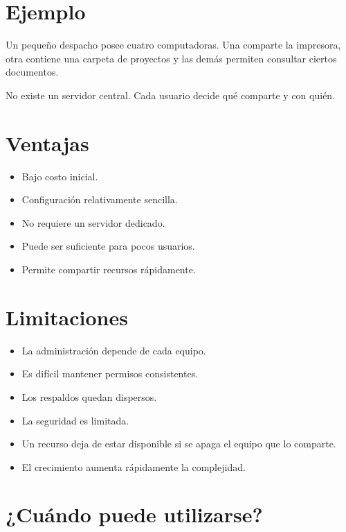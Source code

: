 \documentclass[
  spanish,
  letterpaper,
]{scrbook}
\providecommand{\tightlist}{%
  \setlength{\itemsep}{0pt}\setlength{\parskip}{0pt}}
\begin{document}
\section{Ejemplo}\label{ejemplo}

Un pequeño despacho posee cuatro computadoras. Una comparte la
impresora, otra contiene una carpeta de proyectos y las demás permiten
consultar ciertos documentos.

No existe un servidor central. Cada usuario decide qué comparte y con
quién.

\section{Ventajas}\label{ventajas}

\begin{itemize}
\tightlist
\item
  Bajo costo inicial.
\item
  Configuración relativamente sencilla.
\item
  No requiere un servidor dedicado.
\item
  Puede ser suficiente para pocos usuarios.
\item
  Permite compartir recursos rápidamente.
\end{itemize}

\section{Limitaciones}\label{limitaciones}

\begin{itemize}
\tightlist
\item
  La administración depende de cada equipo.
\item
  Es difícil mantener permisos consistentes.
\item
  Los respaldos quedan dispersos.
\item
  La seguridad es limitada.
\item
  Un recurso deja de estar disponible si se apaga el equipo que lo
  comparte.
\item
  El crecimiento aumenta rápidamente la complejidad.
\end{itemize}

\section{¿Cuándo puede utilizarse?}\label{cuuxe1ndo-puede-utilizarse}
\end{document}
